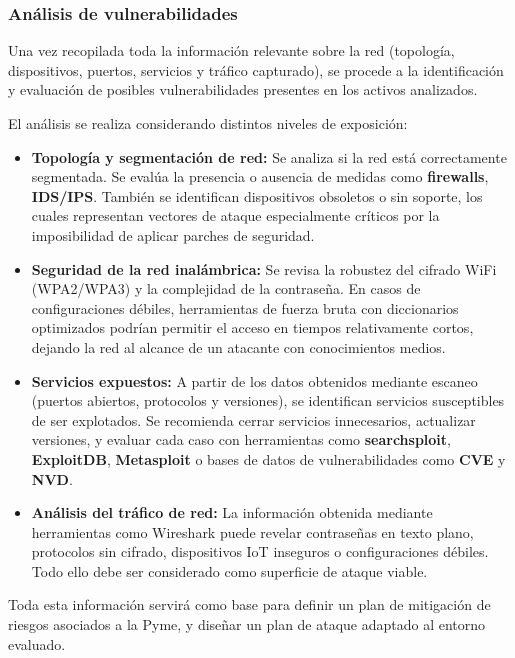 \documentclass[a4paper, 11pt]{article}
\begin{document}
\subsubsection{Análisis de vulnerabilidades}

Una vez recopilada toda la información relevante sobre la red (topología, dispositivos, puertos, servicios y tráfico capturado), se procede a la identificación y evaluación de posibles vulnerabilidades presentes en los activos analizados.


El análisis se realiza considerando distintos niveles de exposición:

\begin{itemize}
    \item \textbf{Topología y segmentación de red:} Se analiza si la red está correctamente segmentada. Se evalúa la presencia o ausencia de medidas como \textbf{firewalls}, \textbf{IDS/IPS}. También se identifican dispositivos obsoletos o sin soporte, los cuales representan vectores de ataque especialmente críticos por la imposibilidad de aplicar parches de seguridad.

    \item \textbf{Seguridad de la red inalámbrica:} Se revisa la robustez del cifrado WiFi (WPA2/WPA3) y la complejidad de la contraseña. En casos de configuraciones débiles, herramientas de fuerza bruta con diccionarios optimizados podrían permitir el acceso en tiempos relativamente cortos, dejando la red al alcance de un atacante con conocimientos medios.

    \item \textbf{Servicios expuestos:} A partir de los datos obtenidos mediante escaneo (puertos abiertos, protocolos y versiones), se identifican servicios susceptibles de ser explotados. Se recomienda cerrar servicios innecesarios, actualizar versiones, y evaluar cada caso con herramientas como \textbf{searchsploit}, \textbf{ExploitDB}, \textbf{Metasploit} o bases de datos de vulnerabilidades como \textbf{CVE} y \textbf{NVD}.
    
    \item \textbf{Análisis del tráfico de red:} La información obtenida mediante herramientas como Wireshark puede revelar contraseñas en texto plano, protocolos sin cifrado, dispositivos IoT inseguros o configuraciones débiles. Todo ello debe ser considerado como superficie de ataque viable.
\end{itemize}

\vspace{0.3cm}
Toda esta información servirá como base para definir un plan de mitigación de riesgos asociados a la Pyme, y diseñar un plan de ataque adaptado al entorno evaluado.
\end{document}
